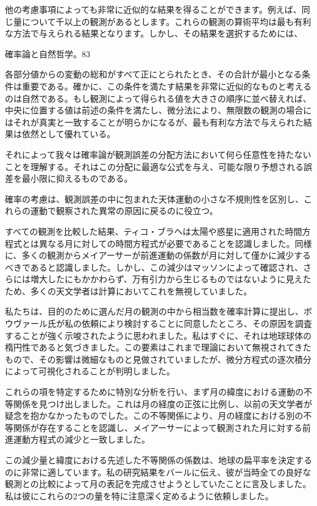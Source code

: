 \documentclass[a4paper,11pt,openany]{ltjsbook}
\begin{document}
他の考慮事項によっても非常に近似的な結果を得ることができます。例えば、同じ量について千以上の観測があるとします。これらの観測の算術平均は最も有利な方法で与えられる結果となります。しかし、その結果を選択するためには、

確率論と自然哲学。83

各部分値からの変動の総和がすべて正にとられたとき、その合計が最小となる条件は重要である。確かに、この条件を満たす結果を非常に近似的なものと考えるのは自然である。もし観測によって得られる値を大きさの順序に並べ替えれば、中央に位置する値は前述の条件を満たし、微分法により、無限数の観測の場合にはそれが真実と一致することが明らかになるが、最も有利な方法で与えられた結果は依然として優れている。

それによって我々は確率論が観測誤差の分配方法において何ら任意性を持たないことを理解する。それはこの分配に最適な公式を与え、可能な限り予想される誤差を最小限に抑えるものである。

確率の考慮は、観測誤差の中に包まれた天体運動の小さな不規則性を区別し、これらの運動で観察された異常の原因に戻るのに役立つ。

すべての観測を比較した結果、ティコ・ブラヘは太陽や惑星に適用された時間方程式とは異なる月に対しての時間方程式が必要であることを認識しました。同様に、多くの観測からメイアーサーが前進運動の係数が月に対して僅かに減少するべきであると認識しました。しかし、この減少はマッソンによって確認され、さらには増大したにもかかわらず、万有引力から生じるものではないように見えたため、多くの天文学者は計算においてこれを無視していました。

私たちは、目的のために選んだ月の観測の中から相当数を確率計算に提出し、ボウヴァール氏が私の依頼により検討することに同意したところ、その原因を調査することが強く示唆されたように思われました。私はすぐに、それは地球球体の楕円性であると気づきました。この要素はこれまで理論において無視されてきたもので、その影響は微細なものと見做されていましたが、微分方程式の逐次積分によって可視化されることが判明しました。

これらの項を特定するために特別な分析を行い、まず月の緯度における運動の不等関係を見つけ出しました。これは月の経度の正弦に比例し、以前の天文学者が疑念を抱かなかったものでした。この不等関係により、月の経度における別の不等関係が存在することを認識し、メイアーサーによって観測された月に対する前進運動方程式の減少と一致しました。

この減少量と緯度における先述した不等関係の係数は、地球の扁平率を決定するのに非常に適しています。私の研究結果をバールに伝え、彼が当時全ての良好な観測との比較によって月の表記を完成させようとしていたことに言及しました。私は彼にこれらの2つの量を特に注意深く定めるように依頼しました。
\end{document}
